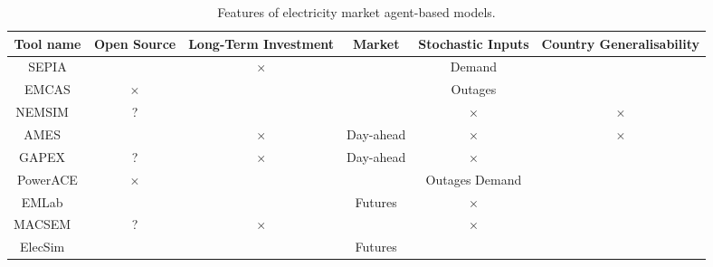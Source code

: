 \begin{table*}[]
	\centering
	\begin{adjustbox}{angle=90}
		\begin{tabular}{cccccc}
			
			\multicolumn{1}{c}{\textbf{Tool name}} & \textbf{Open Source} & \textbf{Long-Term Investment} & \textbf{Market} & \textbf{Stochastic Inputs} & \textbf{Country Generalisability} \\ \midrule
			SEPIA \cite{Harp2000}  & \checkmark           & $\times$                             & \checkmark      & Demand                     & \checkmark                        \\ 
			EMCAS \cite{Conzelmann}   & $\times$                    & \checkmark                    & \checkmark      & Outages                    & \checkmark                        \\ 
			NEMSIM ~\cite{Batten2006}  & ?              & \checkmark                    & \checkmark      & $\times$                          & $\times$                                 \\ 
			AMES  ~\cite{Sun2007} & \checkmark           & $\times$                             & Day-ahead       & $\times$                          & $\times$                                 \\ 
			GAPEX  ~\cite{Cincotti2013} & ?              & $\times$                             & Day-ahead       & $\times$                          & \checkmark                        \\ 
			PowerACE \cite{Rothengatter2007} & $\times$                    & \checkmark                    & \checkmark      & Outages Demand             & \checkmark                        \\ 
			
			EMLab ~\cite{Chappin2017}  & \checkmark           & \checkmark                    & Futures         & $\times$                          & \checkmark                        \\ 
			MACSEM  ~\cite{Praca2003}  & ?              & $\times$                             & \checkmark      & $\times$                          & \checkmark                        \\ 
			ElecSim ~\cite{Kell}             & \checkmark           & \checkmark                    & Futures         & \checkmark                 & \checkmark                        \\ \hline
		\end{tabular}
	\end{adjustbox}
	\caption{Features of electricity market agent-based models.}
	\label{table:litreview:abm_comparison}
\end{table*}



